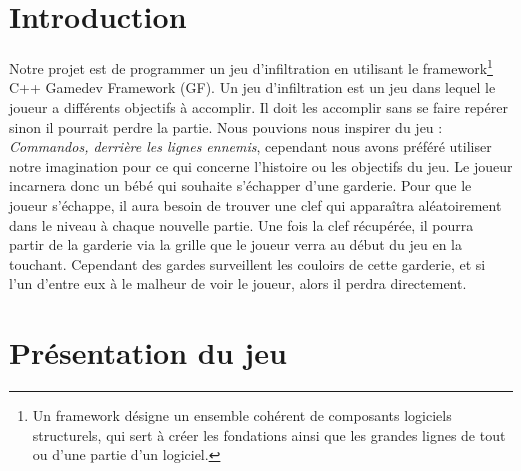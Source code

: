 \documentclass{article}
\begin{document}
\newpage
\hypersetup{pdfborder=0 0 0}

\renewcommand{\contentsname}{Sommaire}

\tableofcontents

\section{Introduction}

Notre projet est de programmer un jeu d'infiltration en utilisant le framework\footnote{Un framework désigne un ensemble cohérent de composants logiciels structurels, qui sert à créer les fondations ainsi que les grandes lignes de tout ou d’une partie d'un logiciel.}
C++ Gamedev Framework (GF). Un jeu d'infiltration est un jeu dans lequel le joueur a différents objectifs à accomplir. Il doit les accomplir sans se faire repérer sinon il pourrait perdre la partie.  Nous pouvions nous inspirer du jeu : \textit{Commandos, derrière les lignes ennemis}, cependant nous avons préféré utiliser notre imagination pour ce qui concerne l'histoire ou les objectifs du jeu.\bigbreak
Le joueur incarnera donc un bébé qui souhaite s'échapper d'une \og garderie\fg. Pour que le joueur s'échappe, il aura besoin de trouver une clef qui apparaîtra aléatoirement dans le niveau à chaque nouvelle partie. Une fois la clef récupérée, il pourra partir de la garderie via la grille que le joueur verra au début du jeu en la touchant. Cependant des gardes surveillent les couloirs de cette garderie, et si l'un d'entre eux à le malheur de voir le joueur, alors il perdra directement. 


\newpage

\section{Présentation du jeu}
\end{document}
